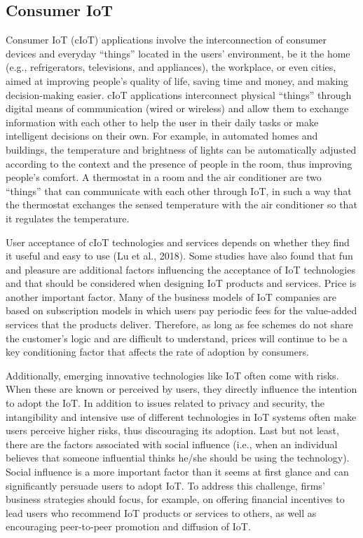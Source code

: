 \documentclass[
  letterpaper,
  DIV=11,
  numbers=noendperiod]{scrreprt}
\begin{document}
\hypertarget{consumer-iot}{%
\subsection{Consumer IoT}\label{consumer-iot}}

Consumer IoT (cIoT) applications involve the interconnection of consumer
devices and everyday ``things'' located in the users' environment, be it
the home (e.g., refrigerators, televisions, and appliances), the
workplace, or even cities, aimed at improving people's quality of life,
saving time and money, and making decision-making easier. cIoT
applications interconnect physical ``things'' through digital means of
communication (wired or wireless) and allow them to exchange information
with each other to help the user in their daily tasks or make
intelligent decisions on their own. For example, in automated homes and
buildings, the temperature and brightness of lights can be automatically
adjusted according to the context and the presence of people in the
room, thus improving people's comfort. A thermostat in a room and the
air conditioner are two ``things'' that can communicate with each other
through IoT, in such a way that the thermostat exchanges the sensed
temperature with the air conditioner so that it regulates the
temperature.

User acceptance of cIoT technologies and services depends on whether
they find it useful and easy to use (Lu et al., 2018). Some studies have
also found that fun and pleasure are additional factors influencing the
acceptance of IoT technologies and that should be considered when
designing IoT products and services. Price is another important factor.
Many of the business models of IoT companies are based on subscription
models in which users pay periodic fees for the value-added services
that the products deliver. Therefore, as long as fee schemes do not
share the customer's logic and are difficult to understand, prices will
continue to be a key conditioning factor that affects the rate of
adoption by consumers.

Additionally, emerging innovative technologies like IoT often come with
risks. When these are known or perceived by users, they directly
influence the intention to adopt the IoT. In addition to issues related
to privacy and security, the intangibility and intensive use of
different technologies in IoT systems often make users perceive higher
risks, thus discouraging its adoption. Last but not least, there are the
factors associated with social influence (i.e., when an individual
believes that someone influential thinks he/she should be using the
technology). Social influence is a more important factor than it seems
at first glance and can significantly persuade users to adopt IoT. To
address this challenge, firms' business strategies should focus, for
example, on offering financial incentives to lead users who recommend
IoT products or services to others, as well as encouraging peer-to-peer
promotion and diffusion of IoT.
\end{document}
